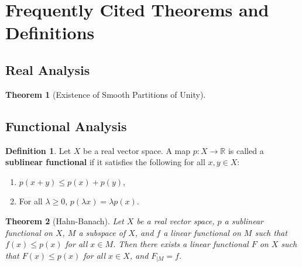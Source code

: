 \documentclass[letterpaper,10pt]{article}
\theoremstyle{definition}
\newtheorem{dfn}{Definition}
\theoremstyle{remark}
\theoremstyle{plain}
\newtheorem{thm}{Theorem}[section]
\begin{document}
\section{Frequently Cited Theorems and Definitions}
\subsection{Real Analysis}
\begin{thm}[Existence of Smooth Partitions of Unity]\label{thm:parunity}

\end{thm}
\subsection{Functional Analysis}
\begin{dfn}
    Let $X$ be a real vector space. A map $p:X\rightarrow\mathbb R$ is called 
    a \textbf{sublinear functional} if it satisfies the following for all $x,y\in X$:
    \begin{enumerate}
        \item $p(x+y)\leq p(x)+p(y)$,
        \item For all $\lambda\geq 0$, $p(\lambda x)=\lambda p(x)$.
    \end{enumerate}
\end{dfn}
\begin{thm}[Hahn-Banach]\label{thm:hahnbanach} %
    Let $X$ be a real vector space, $p$ a sublinear functional on $X$, $M$
    a subspace of $X$, and $f$ a linear functional on $M$ such that $f(x)\leq p(x)$
    for all $x\in M$.
    Then there exists a linear functional $F$ on $X$ such that $F(x)\leq p(x)$
    for all $x\in X$, and $F_{|M}=f$.
\end{thm}
\end{document}
